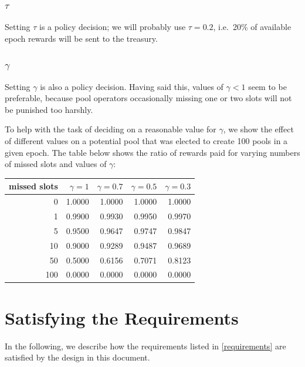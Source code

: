\documentclass[11pt,a4paper]{article}
\begin{document}
\subsubsection{\texorpdfstring{\(\tau\)}{\textbackslash{}tau}}

Setting \(\tau\) is a policy decision; we will probably use
\(\tau=0.2\), i.e.~20\% of available epoch rewards will be sent to the
treasury.

\subsubsection{\texorpdfstring{\(\gamma\)}{\textbackslash{}gamma}}

Setting \(\gamma\) is also a policy decision. Having said this, values
of \(\gamma<1\) seem to be preferable, because pool operators
occasionally missing one or two slots will not be punished too harshly.

To help with the task of deciding on a reasonable value for \(\gamma\),
we show the effect of different values on a potential pool that was
elected to create 100 pools in a given epoch. The table below shows the
ratio of rewards paid for varying numbers of missed slots and values of
\(\gamma\):

\begin{tabular}[t]{rrrrr}
    missed slots & $\gamma=1$ & $\gamma=0.7$ & $\gamma=0.5$ & $\gamma=0.3$ \\
    \hline
      0 & 1.0000 & 1.0000 & 1.0000 & 1.0000 \\
      1 & 0.9900 & 0.9930 & 0.9950 & 0.9970 \\
      5 & 0.9500 & 0.9647 & 0.9747 & 0.9847 \\
     10 & 0.9000 & 0.9289 & 0.9487 & 0.9689 \\
     50 & 0.5000 & 0.6156 & 0.7071 & 0.8123 \\
    100 & 0.0000 & 0.0000 & 0.0000 & 0.0000 \\
\end{tabular}

\section{Satisfying the Requirements}
\label{satisfying-the-requirements}

In the following, we describe how the requirements listed in
\cref{requirements} are satisfied by the design in this document.
\end{document}

